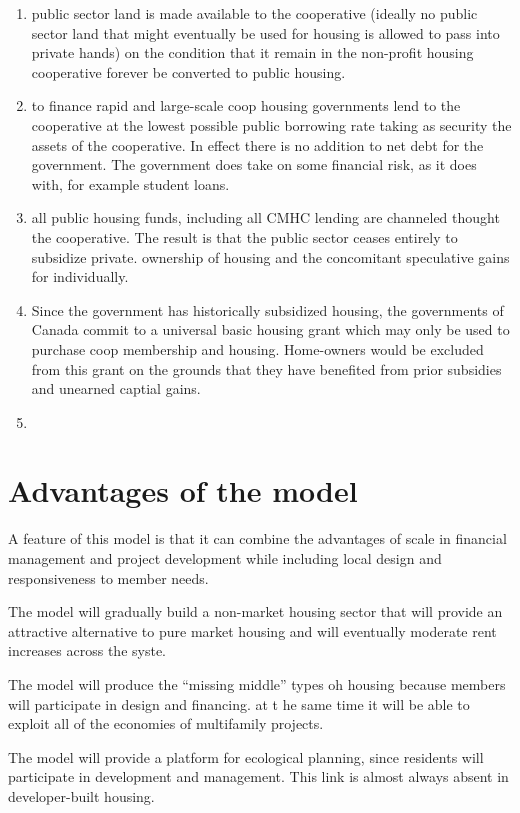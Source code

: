 \begin{enumerate}
 
     \item public sector land is made available to the cooperative (ideally no public sector land that might eventually be used for housing is allowed to pass into private hands) on the condition that it remain in the non-profit housing cooperative forever be converted to public housing. 
     \item to finance rapid and large-scale coop housing governments lend to the cooperative at the lowest possible public borrowing rate taking as security the assets of the cooperative. In effect there is no addition to net debt for the government. The government does take on some financial risk, as it does with, for example student loans.
     \item all public housing funds, including all CMHC lending  are channeled thought the cooperative. The result is that the public sector ceases entirely to subsidize private. ownership of housing and the concomitant speculative gains for individually.
     \item Since the government has historically subsidized housing, the governments of Canada commit to a universal basic housing grant which may only be used to purchase coop membership and housing. Home-owners would be excluded from this grant on the grounds that they have benefited from prior subsidies and unearned captial gains.
     \item  
     
     \end{enumerate}

     
\section{Advantages of the model}

A feature of this model is that it can combine the advantages of scale in financial management and project development while including local design and responsiveness to member needs.

The model will gradually build a non-market housing  sector that will provide an attractive alternative to pure market housing and will eventually moderate rent increases across the syste.

The model will produce the ``missing middle'' types oh housing because members will participate in design and financing. at t he same time it will be able to exploit  all of the economies of multifamily projects. 

The model will provide a platform for ecological planning, since residents will participate in development and management. This link is almost always absent in developer-built housing.


